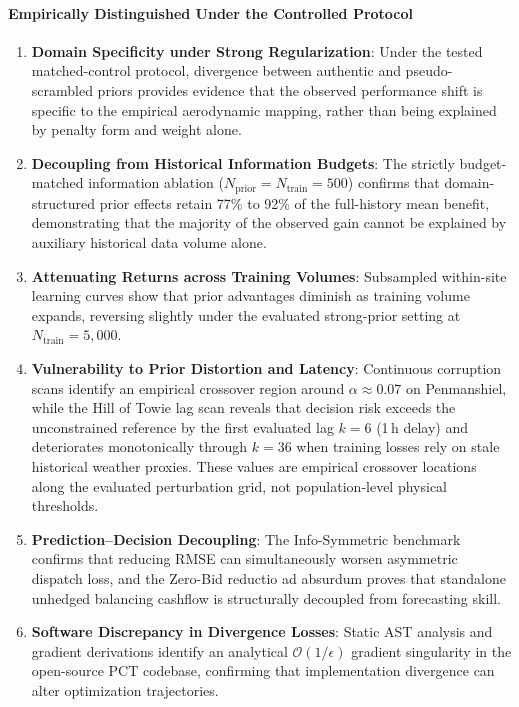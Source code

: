 \paragraph{Empirically Distinguished Under the Controlled Protocol}
\begin{enumerate}[leftmargin=*, label=(\alph*)]
\item \textbf{Domain Specificity under Strong Regularization}: Under the tested matched-control protocol, divergence between authentic and pseudo-scrambled priors provides evidence that the observed performance shift is specific to the empirical aerodynamic mapping, rather than being explained by penalty form and weight alone.
\item \textbf{Decoupling from Historical Information Budgets}: The strictly budget-matched information ablation ($N_{\text{prior}}=N_{\text{train}}=500$) confirms that domain-structured prior effects retain 77\% to 92\% of the full-history mean benefit, demonstrating that the majority of the observed gain cannot be explained by auxiliary historical data volume alone.
\item \textbf{Attenuating Returns across Training Volumes}: Subsampled within-site learning curves show that prior advantages diminish as training volume expands, reversing slightly under the evaluated strong-prior setting at $N_{\text{train}}=5{,}000$.
\item \textbf{Vulnerability to Prior Distortion and Latency}: Continuous corruption scans identify an empirical crossover region around $\alpha \approx 0.07$ on Penmanshiel, while the Hill of Towie lag scan reveals that decision risk exceeds the unconstrained reference by the first evaluated lag $k=6$ (1\,h delay) and deteriorates monotonically through $k=36$ when training losses rely on stale historical weather proxies. These values are empirical crossover locations along the evaluated perturbation grid, not population-level physical thresholds.
\item \textbf{Prediction--Decision Decoupling}: The Info-Symmetric benchmark confirms that reducing RMSE can simultaneously worsen asymmetric dispatch loss, and the Zero-Bid reductio ad absurdum proves that standalone unhedged balancing cashflow is structurally decoupled from forecasting skill.
\item \textbf{Software Discrepancy in Divergence Losses}: Static AST analysis and gradient derivations identify an analytical $\mathcal{O}(1/\epsilon)$ gradient singularity in the open-source PCT codebase, confirming that implementation divergence can alter optimization trajectories.
\end{enumerate}

